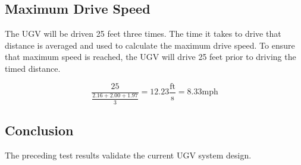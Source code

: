 \documentclass[]{auvsi_doc}
\begin{document}
	\subsection{Maximum Drive Speed}

	
	The UGV will be driven 25 feet three times. The time it takes to drive that distance is averaged and used to calculate the maximum drive speed. To ensure that maximum speed
	is reached, the UGV will drive 25 feet prior to driving the timed distance.


	$$
	\frac{25}{\frac{2.16 + 2.00 + 1.97}{3}} = 12.23 \frac{\textrm{ft}}{\textrm{s}} = 8.33 \textrm{mph}
	$$

\subsection{Conclusion}
The preceding test results validate the current UGV system design. 
\end{document}
